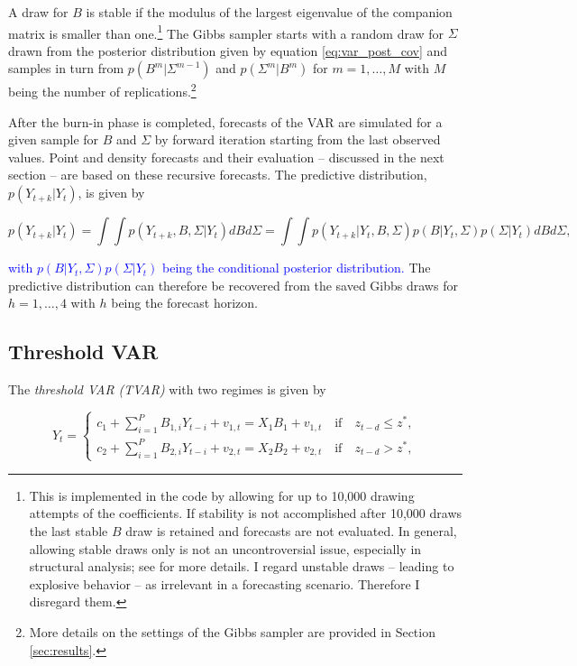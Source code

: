 \documentclass[12pt,letterpaper,fleqn]{article}           %
\begin{document}
A draw for $B$ is stable if the modulus of the largest eigenvalue of the companion matrix is smaller than one.\footnote{This is implemented in the code by allowing for up to 10,000 drawing attempts of the coefficients. If stability is not accomplished after 10,000 draws the last stable $B$ draw is retained and forecasts are not evaluated. In general, allowing stable draws only is not an uncontroversial issue, especially in structural analysis; see \textcite{cogley05} for more details. I regard unstable draws -- leading to explosive behavior -- as irrelevant in a forecasting scenario. Therefore I disregard them.}
The Gibbs sampler starts with a random draw for $\Sigma$ drawn from the posterior distribution given by equation \eqref{eq:var_post_cov} and samples in turn from $p(B^m|\Sigma^{m-1})$ and $p(\Sigma^m|B^m)$ for $m = 1,\ldots,M$ with $M$ being the number of replications.\footnote{More details on the settings of the Gibbs sampler are provided in Section \ref{sec:results}.} 

After the burn-in phase is completed, forecasts of the VAR are simulated for a given sample for $B$ and $\Sigma$ by forward iteration starting from the last observed values. Point and density forecasts and their evaluation -- discussed in the next section -- are based on these recursive forecasts. 
The predictive distribution, $p(Y_{t+k}|Y_t)$, is given by

\begin{equation}
p(Y_{t+k} | Y_t) = \int\int p(Y_{t+k}, B, \Sigma | Y_t) dB d\Sigma = \int\int p(Y_{t+k}|Y_t, B, \Sigma) p(B|Y_t, \Sigma) p(\Sigma | Y_t) dB d\Sigma,
\label{eq:pred_dens}
\end{equation} 

\textcolor{blue}{with $p(B|Y_t, \Sigma) p(\Sigma | Y_t)$ being the conditional posterior distribution.} The predictive distribution can therefore be recovered from the saved Gibbs draws for $h=1,\ldots,4$ with $h$ being the forecast horizon.

\subsection{Threshold VAR}
\label{sec:tar}

The \textit{threshold VAR (TVAR)} with two regimes is given by

\begin{equation}
Y_t =
\begin{cases}
c_1 + \sum_{i=1}^P B_{1,i} Y_{t-i} + v_{1,t} = X_1B_1 + v_{1,t}  \quad \mbox{if} \quad z_{t-d} \leq z^*, \\
c_2 + \sum_{i=1}^P B_{2,i} Y_{t-i} + v_{2,t} = X_2B_2 + v_{2,t} \quad \mbox{if} \quad z_{t-d} > z^*,
\end{cases}
\label{eq:TVAR}
\end{equation}
\end{document}
